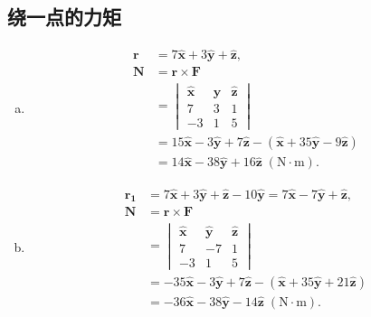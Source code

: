\subsection{绕一点的力矩}
\begin{enumerate}[(a)]
	\item
	\[
	\begin{aligned}
	\bm{r} &=  7\bm{\hat{x}} + 3\bm{\hat{y}} + \bm{\hat{z}}, \\
	\bm{N} &= \bm{r} \times \bm{F} \\
	&=
	\begin{vmatrix}
	\bm{\hat{x}} & \bm{\hat{y}} & \bm{\hat{z}} \\
	7 & 3 & 1 \\
	-3 & 1 & 5
	\end{vmatrix} \\
	&= 15\bm{\hat{x}} - 3\bm{\hat{y}} + 7\bm{\hat{z}} - (\bm{\hat{x}} +35 \bm{\hat{y}} - 9\bm{\hat{z}}) \\    &= 14\bm{\hat{x}} - 38\bm{\hat{y}} + 16\bm{\hat{z}}\;(\textrm{N}\cdot\textrm{m}).
\end{aligned}
	\]
	\item
	\[
	\begin{aligned}
	\bm{r_1} &=  7\bm{\hat{x}} + 3\bm{\hat{y}}+\bm{\hat{z}} - 10\bm{\hat{y}} = 7\bm{\hat{x}} -7 \bm{\hat{y}} + \bm{\hat{z}}, \\
	\bm{N} &= \bm{r} \times \bm{F} \\
	&=
	\begin{vmatrix}
	\bm{\hat{x}} & \bm{\hat{y}} & \bm{\hat{z}} \\
	7 & -7 & 1 \\
	-3 & 1 & 5
	\end{vmatrix} \\
	&= -35\bm{\hat{x}} - 3\bm{\hat{y}} + 7\bm{\hat{z}} - (\bm{\hat{x}} +35 \bm{\hat{y}} + 21 \bm{\hat{z}}) \\    &= -36\bm{\hat{x}} - 38\bm{\hat{y}} - 14\bm{\hat{z}}\;(\textrm{N}\cdot\textrm{m}).
\end{aligned}
	\]
\end{enumerate}
